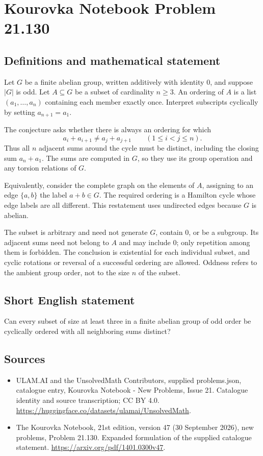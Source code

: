 \documentclass[11pt,a4paper]{article}
\begin{document}
\section*{Kourovka Notebook Problem 21.130}\label{statement}

\subsection{Definitions and mathematical statement}
Let $G$ be a finite abelian group, written additively with identity $0$, and suppose $|G|$ is odd. Let $A\subseteq G$ be a subset of cardinality $n\ge3$. An ordering of $A$ is a list $(a_1,\ldots,a_n)$ containing each member exactly once. Interpret subscripts cyclically by setting $a_{n+1}=a_1$.

The conjecture asks whether there is always an ordering for which
\[
 a_i+a_{i+1}\ne a_j+a_{j+1}
 \qquad(1\le i<j\le n).
\]
Thus all $n$ adjacent sums around the cycle must be distinct, including the closing sum $a_n+a_1$. The sums are computed in $G$, so they use its group operation and any torsion relations of $G$.

Equivalently, consider the complete graph on the elements of $A$, assigning to an edge $\{a,b\}$ the label $a+b\in G$. The required ordering is a Hamilton cycle whose edge labels are all different. This restatement uses undirected edges because $G$ is abelian.

The subset is arbitrary and need not generate $G$, contain $0$, or be a subgroup. Its adjacent sums need not belong to $A$ and may include $0$; only repetition among them is forbidden. The conclusion is existential for each individual subset, and cyclic rotations or reversal of a successful ordering are allowed. Oddness refers to the ambient group order, not to the size $n$ of the subset.
\subsection{Short English statement}
Can every subset of size at least three in a finite abelian group of odd order be cyclically ordered with all neighboring sums distinct?
\subsection{Sources}
\begin{itemize}
\item[S1] ULAM.AI and the UnsolvedMath Contributors, supplied problems.json, catalogue entry, Kourovka Notebook - New Problems, Issue 21. Catalogue identity and source transcription; CC BY 4.0.
\url{https://huggingface.co/datasets/ulamai/UnsolvedMath}.
\item[S2] The Kourovka Notebook, 21st edition, version 47 (30 September 2026), new problems, Problem 21.130. Expanded formulation of the supplied catalogue statement.
\url{https://arxiv.org/pdf/1401.0300v47}.
\end{itemize}
\end{document}
